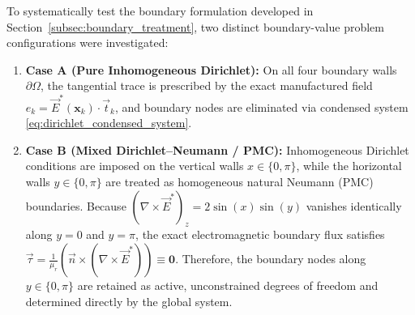 \documentclass[preprint,12pt]{elsarticle}
\begin{document}
To systematically test the boundary formulation developed in Section~\ref{subsec:boundary_treatment}, two distinct boundary-value problem configurations were investigated:
\begin{enumerate}
    \item \textbf{Case A (Pure Inhomogeneous Dirichlet):} On all four boundary walls $\partial\Omega$, the tangential trace is prescribed by the exact manufactured field $e_k = \vec{E}^*(\mathbf{x}_k) \cdot \vec{t}_k$, and boundary nodes are eliminated via condensed system \eqref{eq:dirichlet_condensed_system}.
    \item \textbf{Case B (Mixed Dirichlet--Neumann / PMC):} Inhomogeneous Dirichlet conditions are imposed on the vertical walls $x \in \{0, \pi\}$, while the horizontal walls $y \in \{0, \pi\}$ are treated as homogeneous natural Neumann (PMC) boundaries. Because $(\nabla \times \vec{E}^*)_z = 2\sin(x)\sin(y)$ vanishes identically along $y=0$ and $y=\pi$, the exact electromagnetic boundary flux satisfies $\vec{\tau} = \frac{1}{\mu_r} (\vec{n} \times (\nabla \times \vec{E}^*)) \equiv \mathbf{0}$. Therefore, the boundary nodes along $y \in \{0, \pi\}$ are retained as active, unconstrained degrees of freedom and determined directly by the global system.
\end{enumerate}
\end{document}

